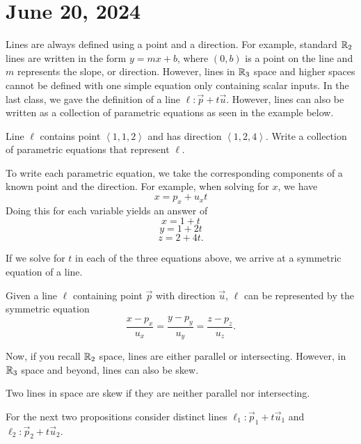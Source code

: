 \documentclass[11pt]{scrartcl}
\begin{document}
\section{June 20, 2024}

Lines are always defined using a point and a direction. For example, standard $\mathbb R_{2}$ lines are written in the form $y = mx + b$, where $(0, b)$ is a point on the line and $m$ represents the slope, or direction. However, lines in $\mathbb R_{3}$ space and higher spaces cannot be defined with one simple equation only containing scalar inputs. In the last class, we gave the definition of a line $\ell : \vec{p} + t\vec{u}$. However, lines can also be written as a collection of parametric equations as seen in the example below.

\begin{example}
    Line $\ell$ contains point $\left<1, 1, 2\right>$ and has direction $\left<1, 2, 4\right>$. Write a collection of parametric equations that represent $\ell$.

    \begin{soln}
        To write each parametric equation, we take the corresponding components of a known point and the direction. For example, when solving for $x$, we have
        \[x = p_{x} + u_{x}t\]
        Doing this for each variable yields an answer of
        \[x = 1 + t\]
        \[y = 1 + 2t\]
        \[z = 2 + 4t.\]
    \end{soln}
\end{example}

If we solve for $t$ in each of the three equations above, we arrive at a symmetric equation of a line.

\begin{corollary}
    Given a line $\ell$ containing point $\vec{p}$ with direction $\vec{u}$, $\ell$ can be represented by the symmetric equation
    \[\frac{x - p_{x}}{u_{x}} = \frac{y - p_{y}}{u_{y}} = \frac{z - p_{z}}{u_{z}}.\]
\end{corollary}

Now, if you recall $\mathbb R_{2}$ space, lines are either parallel or intersecting. However, in $\mathbb R_{3}$ space and beyond, lines can also be skew.

\begin{definition}
    Two lines in space are skew if they are neither parallel nor intersecting.
\end{definition}

For the next two propositions consider distinct lines $\ell_{1} : \vec{p}_{1} + t\vec{u}_{1}$ and $\ell_{2} : \vec{p}_{2} + t\vec{u}_{2}$.
\end{document}
